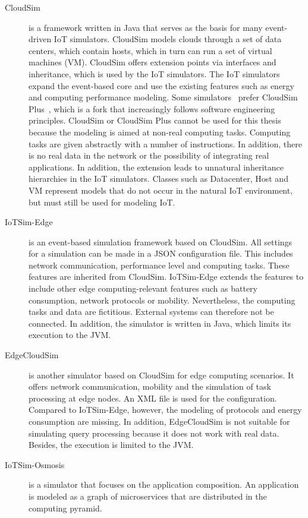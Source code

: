 \documentclass[english,version-2019-11]{uzl-thesis}
\begin{document}
\begin{description}
\item [CloudSim]\cite{simulator_CloudSim} is a framework written in Java that serves as the basis for many event-driven IoT simulators. CloudSim models clouds through a set of data centers, which contain hosts, which in turn can run a set of virtual machines (VM). CloudSim offers extension points via interfaces and inheritance, which is used by the IoT simulators. The IoT simulators expand the event-based core and use the existing features such as energy and computing performance modeling. Some simulators~\cite{simulator_PureEdgeSim}\cite{simulator_recap}\cite{simulator_SatEdgeSim} prefer CloudSim Plus~\cite{simulator_CloudSimPlus}, which is a fork that increasingly follows software engineering principles. CloudSim or CloudSim Plus cannot be used for this thesis because the modeling is aimed at non-real computing tasks. Computing tasks are given abstractly with a number of instructions. In addition, there is no real data in the network or the possibility of integrating real applications. In addition, the extension leads to unnatural inheritance hierarchies in the IoT simulators. Classes such as Datacenter, Host and VM represent models that do not occur in the natural IoT environment, but must still be used for modeling IoT.
\item [IoTSim-Edge]\cite{IoTSimEdge} is an event-based simulation framework based on CloudSim. All settings for a simulation can be made in a JSON configuration file. This includes network communication, performance level and computing tasks. These features are inherited from CloudSim. IoTSim-Edge extends the features to include other edge computing-relevant features such as battery consumption, network protocols or mobility. Nevertheless, the computing tasks and data are fictitious. External systems can therefore not be connected. In addition, the simulator is written in Java, which limits its execution to the JVM.
\item[EdgeCloudSim]\cite{simulator_EdgeCloudSim} is another simulator based on CloudSim for edge computing scenarios. It offers network communication, mobility and the simulation of task processing at edge nodes. An XML file is used for the configuration. Compared to IoTSim-Edge, however, the modeling of protocols and energy consumption are missing. In addition, EdgeCloudSim is not suitable for simulating query processing because it does not work with real data. Besides, the execution is limited to the JVM.
\item[IoTSim-Osmosis]\cite{simulator_osmosis} is a simulator that focuses on the application composition. An application is modeled as a graph of microservices that are distributed in the computing pyramid.

\end{description}
\end{document}

